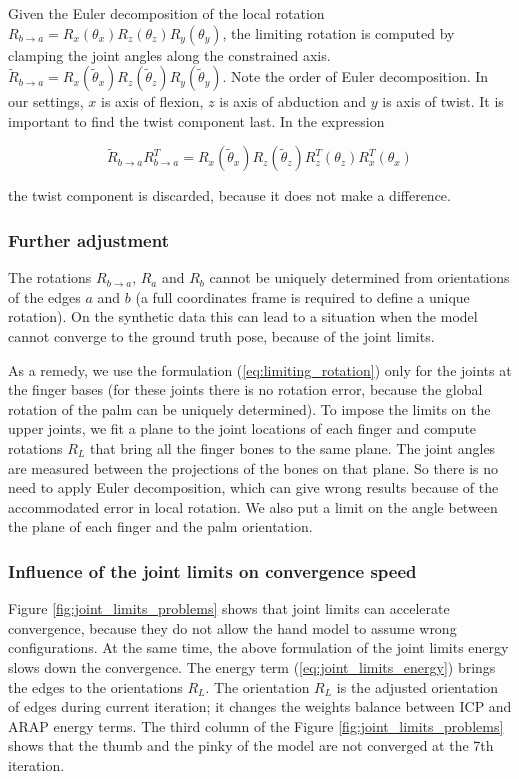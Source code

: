 \documentclass[tog]{acmsiggraph}
\begin{document}
Given the Euler decomposition of the local rotation  $R_{b\rightarrow a} = R_x(\theta_x) R_z(\theta_z) R_y(\theta_y)$, the limiting rotation is computed by clamping the joint angles along the constrained axis.  $\tilde{R}_{b\rightarrow a} = R_x(\tilde{\theta}_x) R_z(\tilde{\theta}_z) R_y(\tilde{\theta}_y)$. Note the order of Euler decomposition. In our settings, $x$ is axis of flexion, $z$ is axis of abduction and $y$ is axis of twist. It is important to find the twist component last. In the expression 

\begin{equation}
\tilde{R}_{b\rightarrow a} R^T_{b\rightarrow a} =  R_x(\tilde{\theta}_x) R_z(\tilde{\theta}_z) R^T_z(\theta_z) R^T_x(\theta_x)
\end{equation}

the twist component is discarded, because it does not make a difference.

\subsubsection{Further adjustment}
The rotations $R_{b \rightarrow a}$, $R_a$ and $R_b$ cannot be uniquely determined from orientations of the edges $a$ and $b$ (a full coordinates frame is required to define a unique rotation). On the synthetic data this can lead to a situation when the model cannot converge to the ground truth pose, because of the joint limits.

As a remedy, we use the formulation (\ref{eq:limiting_rotation}) only for the joints at the finger bases (for these joints there is no rotation error, because the global rotation of the palm can be uniquely determined). To impose the limits on the upper joints, we fit a plane to the joint locations of each finger and compute rotations $R_L$  that bring all the finger bones to the same plane. The joint angles are measured between the projections of the bones on that plane. So there is no need to apply Euler decomposition, which can give wrong results because of the accommodated error in local rotation.
We also put a limit on the angle between the plane of each finger and the palm orientation.

\subsubsection{Influence of the joint limits on convergence speed}
Figure \ref{fig:joint_limits_problems} shows that joint limits can accelerate convergence, because they do not allow the hand model to assume wrong configurations. At the same time, the above formulation of the joint limits energy slows down the convergence. The energy term (\ref{eq:joint_limits_energy}) brings the edges to the orientations $R_L$. The orientation $R_L$ is the adjusted orientation of edges during current iteration; it changes the weights balance between ICP and ARAP energy terms. The third column of the Figure \ref{fig:joint_limits_problems} shows that the thumb and the pinky of the model are not converged at the 7th iteration.
\end{document}
